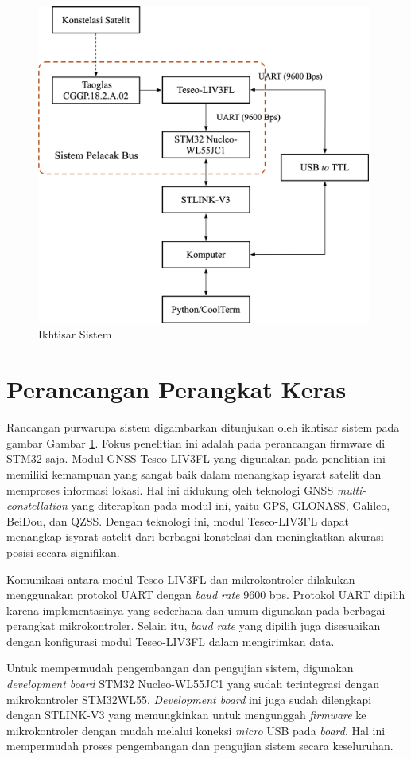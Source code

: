 \begin{figure}[H]
	\centering
	\includegraphics[width=11cm]{contents/chapter-3/system-overview.png}
	\caption{Ikhtisar Sistem}
	\label{Fig: system-overview}
\end{figure}

\section{Perancangan Perangkat Keras}
Rancangan purwarupa sistem digambarkan ditunjukan oleh ikhtisar sistem pada gambar Gambar  \ref{Fig: system-overview}. Fokus penelitian ini adalah pada perancangan firmware di STM32 saja.  Modul GNSS Teseo\hyp{}LIV3FL yang digunakan pada penelitian ini memiliki kemampuan yang sangat baik dalam menangkap isyarat satelit dan memproses informasi lokasi. Hal ini didukung oleh teknologi GNSS \textit{multi-constellation} yang diterapkan pada modul ini, yaitu GPS, GLONASS, Galileo, BeiDou, dan QZSS. Dengan teknologi ini, modul Teseo\hyp{}LIV3FL dapat menangkap isyarat satelit dari berbagai konstelasi dan meningkatkan akurasi posisi secara signifikan.

Komunikasi antara modul Teseo\hyp{}LIV3FL dan mikrokontroler dilakukan menggunakan protokol UART dengan \textit{baud rate} 9600 bps. Protokol UART dipilih karena implementasinya yang sederhana dan umum digunakan pada berbagai perangkat mikrokontroler. Selain itu, \textit{baud rate} yang dipilih juga disesuaikan dengan konfigurasi modul Teseo\hyp{}LIV3FL dalam mengirimkan data.

Untuk mempermudah pengembangan dan pengujian sistem, digunakan \textit{development board} STM32 Nucleo-WL55JC1 yang sudah terintegrasi dengan mikrokontroler STM32WL55. \textit{Development board} ini juga sudah dilengkapi dengan STLINK-V3 yang memungkinkan untuk mengunggah \textit{firmware} ke mikrokontroler dengan mudah melalui koneksi \textit{micro} USB pada \textit{board}. Hal ini mempermudah proses pengembangan dan pengujian sistem secara keseluruhan.

